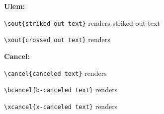 \documentclass[a4paper,11pt]{article}
\begin{document}
\sffamily

\textbf{Ulem:}

\verb+\sout{striked out text}+ renders \sout{striked out text}

\verb+\xout{crossed out text}+ renders 

\textbf{Cancel:}


\verb+\cancel{canceled text}+ renders 

\verb+\bcancel{b-canceled text}+ renders 

\verb+\xcancel{x-canceled text}+ renders 
\end{document}

